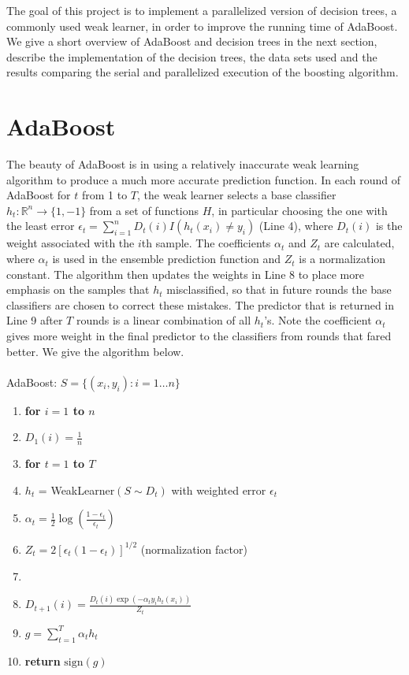 \documentclass[12pt]{article}
\begin{document}
The goal of this project is to implement a parallelized version of decision trees, a commonly
used weak learner, in order to improve the running time of AdaBoost. We
give a short overview of AdaBoost and decision trees in the next section,
describe the implementation of the decision trees, the data sets used and the
results comparing the serial and parallelized execution of the boosting algorithm. 

\section{AdaBoost}

\indent The beauty of AdaBoost is in using a relatively inaccurate
weak learning algorithm to produce a much more accurate prediction function. In
each round of AdaBoost for $t$ from 1 to $T$, the weak learner selects a
base classifier $h_t: \mathbb{R}^n\rightarrow\{1,-1\}$ from a set of functions
$H$, in particular choosing the one with the least error
$\epsilon_t=\sum_{i=1}^{n}D_t(i)I(h_t(x_i)\neq y_i)$ (Line 4), where $D_t(i)$ is
the weight associated with the $i$th sample. The coefficients $\alpha_t$ and $Z_t$ are calculated, where $\alpha_t$ is used in the ensemble prediction function and $Z_t$ is a normalization constant. The algorithm then updates the
weights in Line 8 to place more emphasis on the samples that $h_t$ misclassified,
so that in future rounds the base classifiers are chosen to correct these mistakes. The predictor that is
returned in Line 9 after $T$ rounds is a linear combination of all $h_t$'s. Note the
coefficient $\alpha_t$ gives more weight in the final predictor to the classifiers from rounds that fared better.
We give the algorithm below.\\ \\
{\sc AdaBoost}: $S = \{(x_i,y_i):i = 1\ldots n\}$
\begin{enumerate}
\itemsep1pt \parskip0pt 
\item {\bf for $i=1$ to $n$}
\item \quad $D_1(i) = \frac{1}{n}$
\item {\bf for $t=1$ to $T$}
\item \quad $h_t$ = {\sc WeakLearner}$(S\sim D_t)$ with weighted error $\epsilon_t$
\item \quad $\alpha_t = \frac{1}{2}\log(\frac{1-\epsilon_t}{\epsilon_t})$
\item \quad $Z_t = 2[\epsilon_t(1-\epsilon_t)]^{1/2}$ (normalization factor)
\item {}
\item \quad \quad $D_{t+1}(i) = \frac{D_t(i)\exp(-\alpha_t y_i h_t(x_i))}{Z_t}$
\item $g = \sum_{t=1}^T \alpha_t h_t$
\item {\bf return} $\mbox{sign}(g)$
\end{enumerate}
\end{document}
